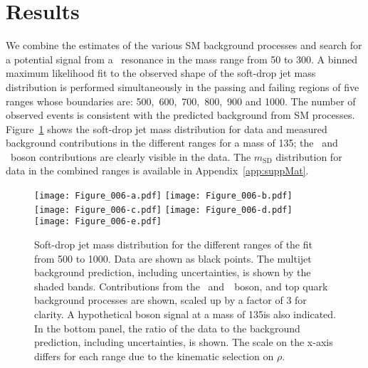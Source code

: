 \documentclass[11pt,twoside,a4paper,cmspaper,final,collab]{cms-tdr}
\begin{document}
\section{Results}

We combine the estimates of the various SM background processes and 
search for a potential signal from a \PZpr~resonance in the mass range from 50 to 300\GeV.
A binned maximum likelihood fit to the observed shape of the
soft-drop jet mass distribution is performed simultaneously in the passing and failing regions
of five \pt ranges whose boundaries are: 500,~600,~700,~800,~900 and 1000\GeV.
The number of observed events is consistent
with the predicted background from SM processes.
Figure~\ref{fig:money} shows the
soft-drop jet mass distribution for data and measured background contributions in the different \pt ranges 
for a \PZpr mass of 135\GeV;
the \PW~and \PZ~boson contributions are clearly visible in the data.
The $m_{\text{SD}}$ distribution for data in the combined \pt ranges 
is available in Appendix~\ref{app:suppMat}.

\begin{figure}[hbtp]
\begin{center}
\texttt{[image: Figure\_006-a.pdf]} \hfil
\texttt{[image: Figure\_006-b.pdf]}\\  
\texttt{[image: Figure\_006-c.pdf]} \hfil
\texttt{[image: Figure\_006-d.pdf]}\\
\texttt{[image: Figure\_006-e.pdf]}
\end{center}
\begin{center}
\caption{Soft-drop jet mass distribution for the different \pt ranges of the fit from 500 to 1000\GeV. 
Data are shown as black points. 
The multijet background prediction, including uncertainties, is shown by the shaded bands. 
Contributions from the \PW~and~\PZ~boson, and top quark background processes 
are shown, scaled up by a factor of 3 for clarity.
A hypothetical \PZpr boson signal at a mass of 135\GeV is also indicated. 
In the bottom panel, the ratio of the data to the background prediction, including uncertainties, is shown. 
The scale on the x-axis differs for each \pt range due to the kinematic selection on $\rho$.}
\label{fig:money}
\end{center}
\end{figure} 
\end{document}
